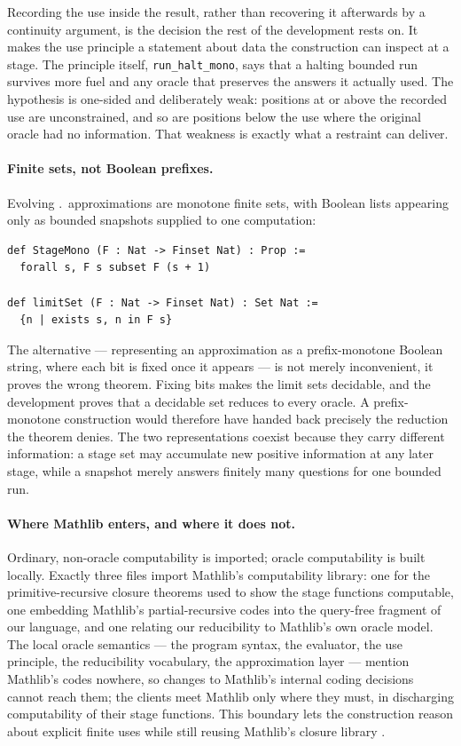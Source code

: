 Recording the use inside the result, rather than recovering it afterwards
by a continuity argument, is the decision the rest of the development rests
on.  It makes the use principle a statement about data the construction can
inspect at a stage.  The principle itself, \texttt{run\_halt\_mono}, says
that a halting bounded run survives more fuel and any oracle that preserves
the answers it actually used.  The hypothesis is one-sided and deliberately
weak: positions at or above the recorded use are unconstrained, and so are
positions below the use where the original oracle had no information.  That
weakness is exactly what a restraint can deliver.

\paragraph{Finite sets, not Boolean prefixes.}
Evolving \ce.\ approximations are monotone finite sets, with Boolean lists
appearing only as bounded snapshots supplied to one computation:

\begin{lstlisting}
def StageMono (F : Nat -> Finset Nat) : Prop :=
  forall s, F s subset F (s + 1)

def limitSet (F : Nat -> Finset Nat) : Set Nat :=
  {n | exists s, n in F s}
\end{lstlisting}

The alternative --- representing an approximation as a prefix-monotone
Boolean string, where each bit is fixed once it appears --- is not merely
inconvenient, it proves the wrong theorem.  Fixing bits makes the limit
sets decidable, and the development proves that a decidable set reduces to
every oracle.  A prefix-monotone construction would therefore have handed
back precisely the reduction the theorem denies.  The two representations
coexist because they carry different information: a stage set may
accumulate new positive information at any later stage, while a snapshot
merely answers finitely many questions for one bounded run.

\paragraph{Where Mathlib enters, and where it does not.}
Ordinary, non-oracle computability is imported; oracle computability is
built locally.  Exactly three files import Mathlib's computability library:
one for the primitive-recursive closure theorems used to show the stage
functions computable, one embedding Mathlib's partial-recursive codes into
the query-free fragment of our language, and one relating our reducibility
to Mathlib's own oracle model.  The local oracle semantics --- the program
syntax, the evaluator, the use principle, the reducibility vocabulary, the
approximation layer --- mention Mathlib's codes nowhere, so changes to
Mathlib's internal coding decisions cannot reach them; the clients meet
Mathlib only where they must, in discharging computability of their stage
functions.  This
boundary lets the construction reason about explicit finite uses while
still reusing Mathlib's closure library \cite{carneiro2019,mathlibPartrec}.

